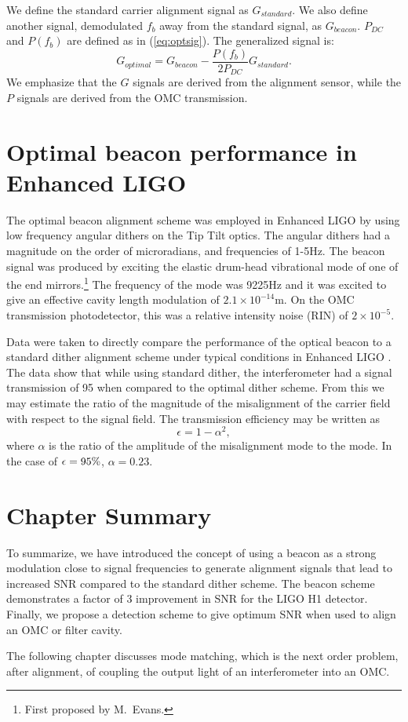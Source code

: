 We define the standard carrier alignment signal as $G_{standard}$. %
We also define another signal, demodulated $f_b$ away from the standard signal, as $G_{beacon}$. %
$P_{DC}$ and $P(f_b)$ are defined as in (\ref{eq:optsig}). %
The generalized signal is:
%
\begin{equation}
G_{optimal} = G_{beacon} - \frac{P(f_b)}{2P_{DC}} G_{standard}.
\end{equation}
%
We emphasize that the $G$ signals are derived from the alignment sensor, while the $P$ signals are derived from the OMC transmission.

\section{Optimal beacon performance in Enhanced LIGO}
The optimal beacon alignment scheme was employed in Enhanced LIGO by using low frequency angular dithers on the Tip Tilt optics. %
The angular dithers had a magnitude on the order of microradians, and frequencies of 1-5Hz. %
The beacon signal was produced by exciting the elastic drum-head vibrational mode of one of the end mirrors.\footnote{First proposed by M.\ Evans.} The frequency of the mode was 9225Hz and it was excited to give an effective cavity length modulation of $2.1\times10^{-14}$m. %
On the OMC transmission photodetector, this was a relative intensity noise (RIN) of $2\times10^{-5}$.

Data were taken to directly compare the performance of the optical beacon to a standard dither alignment scheme under typical conditions in Enhanced LIGO \cite{mattbeaconmeas}. %
The data show that while using standard dither, the interferometer had a signal transmission of 95\perc{} when compared to the optimal dither scheme. %
From this we may estimate the ratio of the magnitude of the misalignment of the carrier field with respect to the signal field. %
The transmission efficiency may be written as
\begin{equation}
\epsilon = 1 - \alpha^2,
\end{equation}
where $\alpha$ is the ratio of the amplitude of the misalignment mode to the  mode. %
In the case of $\epsilon = 95\%{}$, $\alpha = 0.23$.
\section{Chapter Summary}
To summarize, we have introduced the concept of using a beacon as a strong modulation close to signal frequencies to generate alignment signals that lead to increased SNR compared to the standard dither scheme. %
The beacon scheme demonstrates a factor of 3 improvement in SNR for the LIGO H1 detector. %
Finally, we propose a detection scheme to give optimum SNR when used to align an OMC or filter cavity.

The following chapter discusses mode matching, which is the next order problem, after alignment, of coupling the output light of an interferometer into an OMC.
